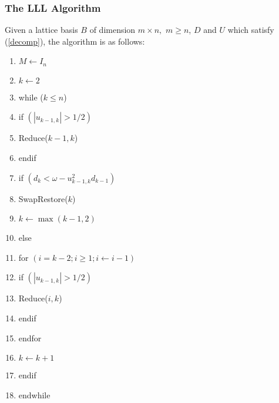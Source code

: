 \documentclass{beamer}
\begin{document}
\begin{frame}
\frametitle{The LLL Algorithm}
Given a lattice basis $B$ of dimension $m\times n,$ $m\geq n$, $D$ and $U$ which satisfy (\ref{decomp}), the algorithm is as follows\cite{LuoQiaoParallelLLL}:
\begin{tiny}
\begin{enumerate}[1]
\item $M\leftarrow I_n$
\item $k\leftarrow 2$
\item while ($k\leq n$)
\item \hspace{2em} if $\left(|u_{k-1,k}|>1/2\right)$
\item \hspace{2em}\hspace{2em} Reduce($k-1,k$)
\item \hspace{2em} endif
\item \hspace{2em} if $\left(d_k<\omega -u^2_{k-1,k}d_{k-1}\right)$
\item \hspace{2em}\hspace{2em} SwapRestore($k$)
\item \hspace{2em}\hspace{2em} $k\leftarrow\max(k-1,2)$
\item \hspace{2em} else
\item \hspace{2em}\hspace{2em} for $\left(i=k-2; i \geq 1; i\leftarrow i-1\right)$
\item \hspace{2em}\hspace{2em} \hspace{2em} if $\left(|u_{k-1,k}|>1/2\right)$
\item \hspace{2em}\hspace{2em} \hspace{2em} \hspace{2em} Reduce($i,k$)
\item \hspace{2em}\hspace{2em} \hspace{2em} endif
\item \hspace{2em}\hspace{2em} endfor
\item \hspace{2em} $k\leftarrow k+1$
\item \hspace{2em} endif
\item endwhile
\end{enumerate}
\end{tiny}
\end{frame}
\end{document}
